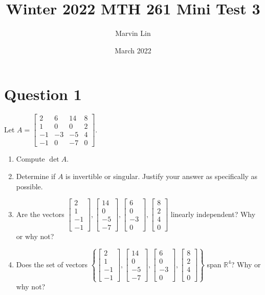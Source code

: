 \documentclass{report}
\title{Winter 2022 MTH 261 Mini Test 3}
\author{Marvin Lin}
\date{March 2022}
\begin{document}
\maketitle

\section*{Question 1}
\begin{example}
    Let $A = \begin{bmatrix} 2 & 6 & 14 & 8 \\ 1 & 0 & 0 & 2 \\ -1 & -3 & -5 & 4 \\ -1 & 0 & -7 & 0 \end{bmatrix}$. 
    \begin{enumerate}
    \item Compute $\det A$. 
    \item Determine if $A$ is invertible or singular. Justify your answer as specifically as possible.
    \item Are the vectors $\begin{bmatrix} 2 \\ 1 \\ -1 \\ -1 \end{bmatrix}, \begin{bmatrix} 14 \\ 0 \\ -5 \\ -7 \end{bmatrix}, \begin{bmatrix} 6 \\ 0 \\ -3 \\ 0 \end{bmatrix}, \begin{bmatrix} 8 \\ 2 \\ 4 \\ 0 \end{bmatrix}$ linearly independent? Why or why not?
    \item Does the set of vectors $\left\{\begin{bmatrix} 2 \\ 1 \\ -1 \\ -1 \end{bmatrix}, \begin{bmatrix} 14 \\ 0 \\ -5 \\ -7 \end{bmatrix}, \begin{bmatrix} 6 \\ 0 \\ -3 \\ 0 \end{bmatrix}, \begin{bmatrix} 8 \\ 2 \\ 4 \\ 0 \end{bmatrix}\right\}$ span $\mathbb{R}^4$? Why or why not?
    \end{enumerate}
\end{example}
\end{document}
